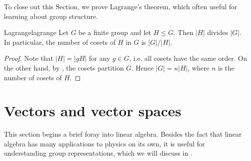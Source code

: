 To close out this Section, we prove Lagrange's theorem, which often useful
for learning about group structure.
\begin{theorem}{Lagrange}{lagrange}
Let $G$ be a finite group and let $H\leq G$. Then $|H|$ divides $|G|$.
In particular, the number of cosets of $H$ in $G$ is $|G|/|H|$.
\begin{proof}
Note that $|H|=|gH|$ for any $g\in G$, i.e. all cosets have the same
order. On the other hand, by , the cosets
partition $G$. Hence $|G|=n|H|$, where $n$ is the number of cosets of $H$.
\end{proof}
\end{theorem}


\section{Vectors and vector spaces}\label{sec:vectors}

  This section begins a brief foray into linear algebra.
  Besides the fact that linear algebra has many applications to
  physics on its own, it is useful for understanding group
  representations, which we will discuss in .

